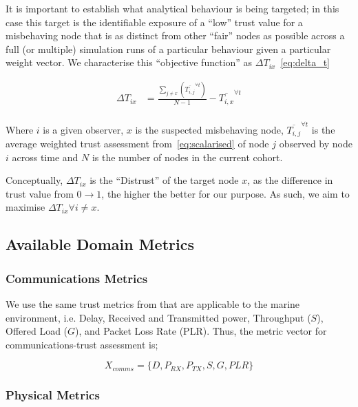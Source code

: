 \documentclass[conference]{IEEEtran}
\begin{document}
It is important to establish what analytical behaviour is being targeted; in this case this target is the identifiable exposure of a ``low'' trust value for a misbehaving node that is as distinct from other ``fair'' nodes as possible across a full (or multiple) simulation runs of a particular behaviour given a particular weight vector.
We characterise this ``objective function'' as $\Delta T_{ix}$~\eqref{eq:delta_t}

\begin{align}
  \Delta T_{ix} &= \frac{\sum_{j\neq x}\left( \overline{T_{i,j}}^{\forall t}\right)}{N-1} - \overline{T_{i,x}}^{\forall t} \label{eq:delta_t}\\
\end{align}

Where $i$ is a given observer, $x$ is the suspected misbehaving node, $\overline{T_{i,j}}^{\forall t}$ is the average weighted trust assessment from~\eqref{eq:scalarised} of node $j$ observed by node $i$ across time and $N$ is the number of nodes in the current cohort.

Conceptually, $\Delta T_{ix}$ is the ``Distrust'' of the target node $x$, as the difference in trust value from $0\to1$, the higher the better for our purpose. 
As such, we aim to maximise $\Delta T_{ix}\forall i\neq x$.


\subsection{Available Domain Metrics}

\subsubsection{Communications Metrics}

We use the same trust metrics from \cite{Guo2012} that are applicable to the marine environment, i.e. Delay, Received and Transmitted power, Throughput ($S$), Offered Load ($G$), and Packet Loss Rate (PLR).
Thus, the metric vector for communications-trust assessment is;

\begin{equation}
  X_{comms}=\{D, P_{RX}, P_{TX}, S, G, PLR\}
	\label{eq:comms_vector}
\end{equation}

\subsubsection{Physical Metrics}
\end{document}
